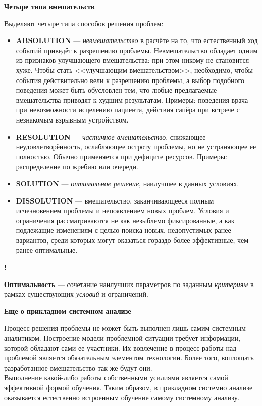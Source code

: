 \documentclass{article}
\newcommand{\note}[1]{\textit{#1}}
\newcommand{\important}[1]{\textbf{#1}}
\renewcommand{\subsection}[1]{
	\vspace{2em}
	\begin{flushright}
		\large
		\textbf{#1}
	\end{flushright}
	}
\newcommand{\define}[2]{
	\textbf{#1} --- #2
	}
\newcommand{\marked}[2]{
	\begin{flushright}\textbf{!}\hspace{2ex}\vline\hspace{2ex}
		\begin{minipage}{0.9\textwidth}
			\define{#1}{#2}
		\end{minipage}
	\end{flushright}
	}
\begin{document}
\subsection{Четыре типа вмешательств}
Выделяют четыре типа способов решения проблем:
\begin{itemize}
	\item \important{ABSOLUTION} --- \note{невмешательство} в расчёте на то, что естественный ход событий приведёт к разрешению проблемы. Невмешательство обладает одним из признаков улучшающего вмешательства: при этом никому не становится хуже. Чтобы стать <<улучшающим вмешательством>>, необходимо, чтобы события действительно вели к разрешению проблемы, а выбор подобного поведения может быть обусловлен тем, что любые предлагаемые вмешательства приводят к худшим результатам. Примеры: поведения врача при невозможности исцелению пациента, действия сапёра при встрече с незнакомым взрывным устройством.
	\item \important{RESOLUTION} --- \note{частичное вмешательство}, снижающее неудовлетворённость, ослабляющее остроту проблемы, но не устраняющее ее полностью. Обычно применяется при дефиците ресурсов. Примеры: распределение по жребию или очереди.
	\item \important{SOLUTION} --- \note{оптимальное решение}, наилучшее в данных условиях. 
	\item \important{DISSOLUTION} --- вмешательство, заканчивающееся полным исчезновением проблемы и непоявлением новых проблем. Условия и ограничения рассматриваются не как незыблемо фиксированные, а как подлежащие изменениям с целью поиска новых, недопустимых ранее вариантов, среди которых могут оказаться гораздо более эффективные, чем ранее оптимальные.	
\end{itemize}
\marked{Оптимальность}{сочетание наилучших параметров по заданным \note{критериям} в рамках существующих \note{условий} и ограничений.}
\subsection{Еще о прикладном системном анализе}
Процесс решения проблемы не может быть выполнен лишь самим системным аналитиком. Построение модели проблемной ситуации требует информации, которой обладают сами ее участники. Их вовлечение в процесс работы над проблемой является обязательным элементом технологии. Более того, воплощать разработанное вмешательство так же будут они.\\
Выполнение какой-либо работы собственными усилиями является самой эффективной формой обучения. Таким образом, в прикладном системно анализе оказывается естественно встроенным обучение самому системному анализу.
\end{document}

